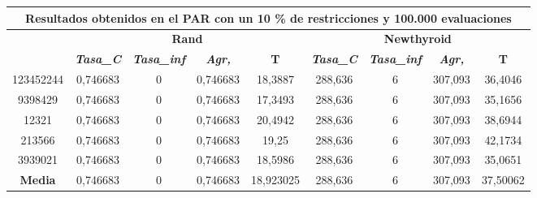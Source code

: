 \documentclass[12pt, spanish]{article}
\begin{document}
\begin{table}[H]
\begin{tabular}{|c|c|c|c|c|c|c|c|c|}
\hline
\multicolumn{9}{|c|}{\textbf{Resultados obtenidos en el PAR con un 10 \% de restricciones y 100.000 evaluaciones}}                                                                                                \\ \hline
\multirow{2}{*}{} & \multicolumn{4}{c|}{\textbf{Rand}}                                                            & \multicolumn{4}{c|}{\textbf{Newthyroid}}                                                      \\ \cline{2-9} 
                  & \textit{\textbf{Tasa\_C}} & \textit{\textbf{Tasa\_inf}} & \textit{\textbf{Agr,}} & \textbf{T} & \textit{\textbf{Tasa\_C}} & \textit{\textbf{Tasa\_inf}} & \textit{\textbf{Agr,}} & \textbf{T} \\ \hline
123452244         & 0,746683                  & 0                           & 0,746683               & 18,3887    & 288,636                   & 6                           & 307,093                & 36,4046    \\ \hline
9398429           & 0,746683                  & 0                           & 0,746683               & 17,3493    & 288,636                   & 6                           & 307,093                & 35,1656    \\ \hline
12321             & 0,746683                  & 0                           & 0,746683               & 20,4942    & 288,636                   & 6                           & 307,093                & 38,6944    \\ \hline
213566            & 0,746683                  & 0                           & 0,746683               & 19,25      & 288,636                   & 6                           & 307,093                & 42,1734    \\ \hline
3939021           & 0,746683                  & 0                           & 0,746683               & 18,5986    & 288,636                   & 6                           & 307,093                & 35,0651    \\ \hline
\textbf{Media}    & 0,746683                  & 0                           & 0,746683               & 18,923025  & 288,636                   & 6                           & 307,093                & 37,50062   \\ \hline
\end{tabular}
\end{table}
\end{document}
